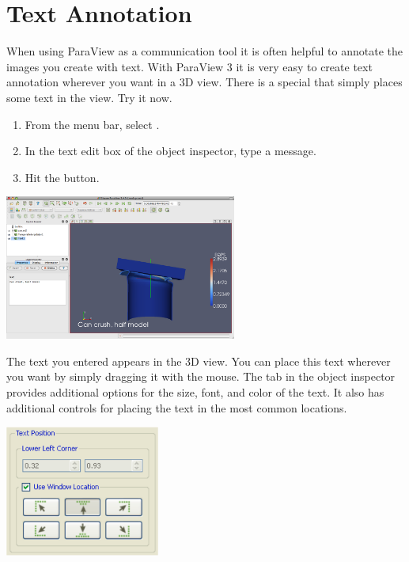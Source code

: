 \section{Text Annotation}

When using ParaView as a communication tool it is often helpful to annotate
the images you create with text.  With ParaView 3 it is very easy to create
text annotation wherever you want in a 3D view.  There is a special
 that simply places some text in the view.  Try it
now.

\begin{enumerate}
\item From the menu bar, select  \ra {}.
\item In the text edit box of the object inspector, type a message.
\item Hit the \apply button.
\end{enumerate}

\begin{inlinefig}
  \includegraphics[width=3in]{images/TextSource}
\end{inlinefig}

The text you entered appears in the 3D view.  You can place this text
wherever you want by simply dragging it with the mouse.  The 
tab in the object inspector provides additional options for the size, font,
and color of the text.  It also has additional controls for placing the
text in the most common locations.

\begin{inlinefig}
  \includegraphics[width=2in]{images/TextPosition}
\end{inlinefig}


